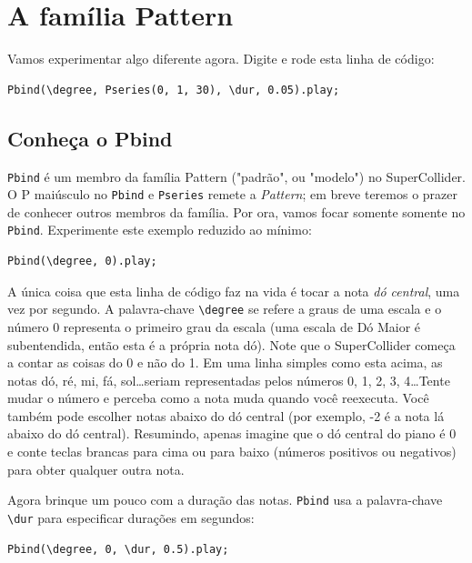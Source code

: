 \section{A família Pattern}

Vamos experimentar algo diferente agora. Digite e rode esta linha de código:

\begin{lstlisting}[style=SuperCollider-IDE, basicstyle=\scttfamily\footnotesize]
Pbind(\degree, Pseries(0, 1, 30), \dur, 0.05).play;
\end{lstlisting}

\subsection{Conheça o Pbind}

\texttt{Pbind} é um membro da família Pattern ("padrão", ou "modelo") no SuperCollider. O P maiúsculo no \texttt{Pbind} e \texttt{Pseries} remete a \emph{Pattern}; em breve teremos o prazer de conhecer outros membros da família. Por ora, vamos focar somente somente no \texttt{Pbind}. Experimente este exemplo reduzido ao mínimo:

\begin{lstlisting}[style=SuperCollider-IDE, basicstyle=\scttfamily\footnotesize]
Pbind(\degree, 0).play;
\end{lstlisting}

A única coisa que esta linha de código faz na vida é tocar a nota \emph{dó central}, uma vez por segundo. A palavra-chave \texttt{\textbackslash degree} se refere a graus de uma escala e o número 0 representa o primeiro grau da escala (uma escala de Dó Maior é subentendida, então esta é a própria nota dó). Note que o SuperCollider começa a contar as coisas do 0 e não do 1. Em uma linha simples como esta acima, as notas dó, ré, mi, fá, sol\dots seriam representadas pelos números 0, 1, 2, 3, 4\dots Tente mudar o número e perceba como a nota muda quando você reexecuta. Você também pode escolher notas abaixo do dó central (por exemplo, -2 é a nota lá abaixo do dó central). Resumindo, apenas imagine que o dó central do piano é 0 e conte teclas brancas para cima ou para baixo (números positivos ou negativos) para obter qualquer outra nota.

Agora brinque um pouco com a duração das notas. \texttt{Pbind} usa a palavra-chave \texttt{\textbackslash dur} para especificar durações em segundos:

\begin{lstlisting}[style=SuperCollider-IDE, basicstyle=\scttfamily\footnotesize]
Pbind(\degree, 0, \dur, 0.5).play;
\end{lstlisting}

